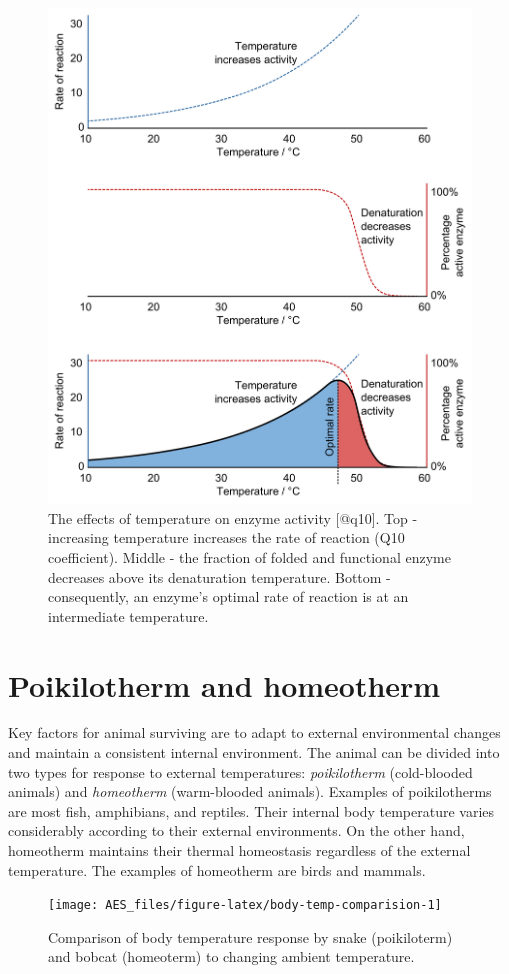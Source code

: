 \documentclass[]{book}
\begin{document}
\begin{figure}

{\centering \includegraphics[width=0.6\linewidth]{figures/q10} 

}

\caption{The effects of temperature on enzyme activity [@q10]. Top - increasing temperature increases the rate of reaction (Q10 coefficient). Middle - the fraction of folded and functional enzyme decreases above its denaturation temperature. Bottom - consequently, an enzyme's optimal rate of reaction is at an intermediate temperature.}\label{fig:q10}
\end{figure}

\hypertarget{poikilotherm-and-homeotherm}{%
\section{Poikilotherm and homeotherm}\label{poikilotherm-and-homeotherm}}

Key factors for animal surviving are to adapt to external environmental changes and maintain a consistent internal environment. The animal can be divided into two types for response to external temperatures: \emph{poikilotherm} (cold-blooded animals) and \emph{homeotherm} (warm-blooded animals). Examples of poikilotherms are most fish, amphibians, and reptiles. Their internal body temperature varies considerably according to their external environments. On the other hand, homeotherm maintains their thermal homeostasis regardless of the external temperature. The examples of homeotherm are birds and mammals.

\begin{figure}

{\centering \texttt{[image: AES\_files/figure-latex/body-temp-comparision-1]} 

}

\caption{Comparison of body temperature response by snake (poikiloterm) and bobcat (homeoterm) to changing ambient temperature.}\label{fig:body-temp-comparision}
\end{figure}
\end{document}
